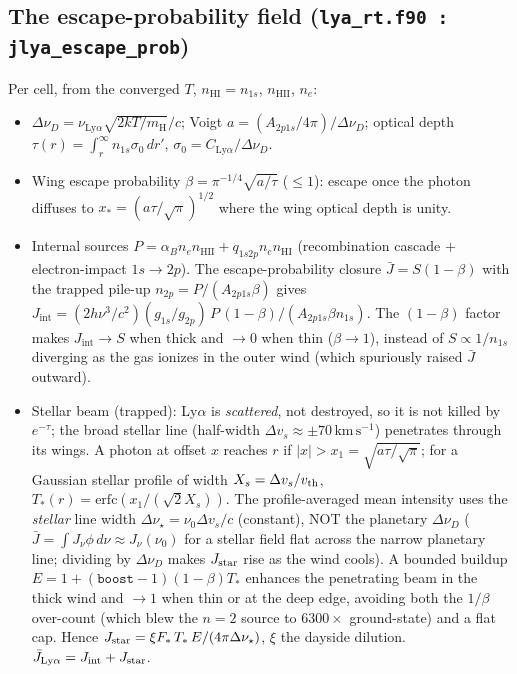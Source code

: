 \documentclass[english,a4paper]{kiseon_memo}
\begin{document}
\subsection{The escape-probability field (\texttt{lya\_rt.f90 : jlya\_escape\_prob})}
Per cell, from the converged \(T\), \(n_{\mathrm{HI}}=n_{1s}\), \(n_{\mathrm{HII}}\),
\(n_e\):
\begin{itemize}
\item \(\Delta\nu_D=\nu_{\mathrm{Ly}\alpha}\sqrt{2kT/m_{\mathrm H}}/c\); Voigt
\(a=(A_{2p1s}/4\pi)/\Delta\nu_D\); optical depth
\(\tau(r)=\int_r^\infty n_{1s}\sigma_0\,dr'\), \(\sigma_0=C_{\mathrm{Ly}\alpha}/\Delta\nu_D\).
\item Wing escape probability \(\beta=\pi^{-1/4}\sqrt{a/\tau}\) (\(\le1\)): escape
once the photon diffuses to \(x_*=(a\tau/\sqrt\pi)^{1/2}\) where the wing optical
depth is unity.
\item Internal sources \(P=\alpha_B n_e n_{\mathrm{HII}}+q_{1s2p}n_e n_{\mathrm{HI}}\)
(recombination cascade \(+\) electron-impact \(1s\to2p\)). The escape-probability
closure \(\bar J=S(1-\beta)\) with the trapped pile-up \(n_{2p}=P/(A_{2p1s}\beta)\)
gives \(J_{\mathrm{int}}=(2h\nu^3/c^2)(g_{1s}/g_{2p})\,P\,(1-\beta)/(A_{2p1s}\beta n_{1s})\).
The \((1-\beta)\) factor makes \(J_{\mathrm{int}}\to S\) when thick and \(\to0\) when
thin (\(\beta\to1\)), instead of \(S\propto1/n_{1s}\) diverging as the gas ionizes
in the outer wind (which spuriously raised \(\bar J\) outward).
\item Stellar beam (trapped): Ly\(\alpha\) is \emph{scattered}, not destroyed, so it
is not killed by \(e^{-\tau}\); the broad stellar line (half-width
\(\Delta v_s\approx\pm70\,\mathrm{km\,s^{-1}}\)) penetrates through its wings. A
photon at offset \(x\) reaches \(r\) if \(|x|>x_1=\sqrt{a\tau/\sqrt\pi}\); for a
Gaussian stellar profile of width \(X_s=\Delta v_s/v_{\rm th}\),
\(T_*(r)=\mathrm{erfc}(x_1/(\sqrt2 X_s))\). The profile-averaged mean intensity uses
the \emph{stellar} line width \(\Delta\nu_\star=\nu_0\Delta v_s/c\) (constant), NOT
the planetary \(\Delta\nu_D\) (\(\bar J=\int J_\nu\phi\,d\nu\approx J_\nu(\nu_0)\) for
a stellar field flat across the narrow planetary line; dividing by \(\Delta\nu_D\)
makes \(J_{\rm star}\) rise as the wind cools). A bounded buildup
\(E=1+(\mathtt{boost}-1)(1-\beta)T_*\) enhances the penetrating beam in the thick
wind and \(\to1\) when thin or at the deep edge, avoiding both the \(1/\beta\)
over-count (which blew the \(n{=}2\) source to \(6300\times\) ground-state) and a
flat cap. Hence \(J_{\rm star}=\xi F_*\,T_*\,E/(4\pi\Delta\nu_\star)\), \(\xi\) the
dayside dilution. \(\bar J_{\mathrm{Ly}\alpha}=J_{\mathrm{int}}+J_{\rm star}\).
\end{itemize}
\end{document}
